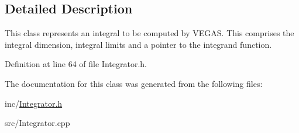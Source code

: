 \subsection{Detailed Description}
This class represents an integral to be computed by V\-E\-G\-A\-S. This comprises the integral dimension, integral limits and a pointer to the integrand function. 

Definition at line 64 of file Integrator.\-h.



The documentation for this class was generated from the following files\-:\begin{DoxyCompactItemize}
\item 
inc/\hyperlink{Integrator_8h}{Integrator.\-h}\item 
src/Integrator.\-cpp\end{DoxyCompactItemize}
